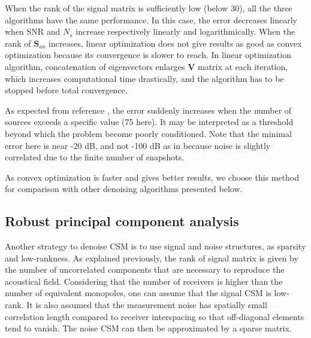 \documentclass[fontsize=12pt,DIV13,paper=a4,abstract=true,titlepage=false]{scrartcl}
\begin{document}
%			

When the rank of the signal matrix is sufficiently low (below 30), all the three algorithms have the same performance. In this case, the error decreases linearly when SNR and $N_s$ increase respectively linearly and logarithmically.
When the rank of $\bm{S}_{aa}$ increases, linear optimization does not give results as good as convex optimization because its convergence is slower to reach. In linear optimization algorithm, concatenation of eigenvectors enlarges $\bm{V}$ matrix at each iteration, which increases computational time drastically, and the algorithm has to be stopped before total convergence.

As expected from reference \citep{Hald2017}, the error suddenly increases when the number of sources exceeds a specific value (75 here). It may be interpreted as a threshold beyond which the problem become poorly conditioned.
Note that the minimal error here is near -20 dB, and not -100 dB as in  \citep{Hald2017} because noise is slightly correlated due to the finite number of snapshots.

As convex optimization is faster and gives better results, we choose this method for comparison with other denoising algorithms presented below.


\subsection{Robust principal component analysis}
Another strategy to denoise CSM is to use signal and noise structures, as sparsity and low-rankness. As explained previously, the rank of signal matrix is given by the number of uncorrelated components that are necessary to reproduce the acoustical field. Considering that the number of receivers is higher than the number of equivalent monopoles, one can assume that the signal CSM is low-rank. It is also assumed that the measurement noise has spatially small correlation length compared to receiver interspacing so that off-diagonal elements tend to vanish. The noise CSM can then be approximated by a sparse matrix.
\end{document}
